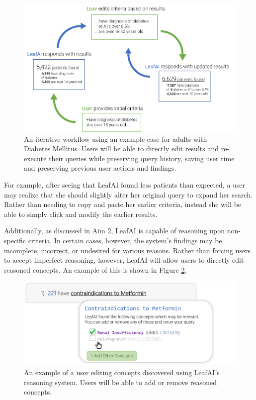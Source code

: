 \documentclass[../main.tex]{subfiles}
\begin{document}
\begin{figure}[h!]
  \centering
  \includegraphics[scale=1]{Figures/Aim3/aim3_feedback_loop.pdf}  
  \caption{An iterative workflow using an example case for adults with Diabetes Mellitus. Users will be able to directly edit results and re-execute their queries while preserving query history, saving user time and preserving previous user actions and findings.}
\label{aim3_fig_feedback_loop}
\end{figure}

For example, after seeing that LeafAI found less patients than expected, a user may realize that she should slightly alter her original query to expand her search. Rather than needing to copy and paste her earlier criteria, instead she will be able to simply click and modify the earlier results.

Additionally, as discussed in Aim 2, LeafAI is capable of reasoning upon non-specific criteria. In certain cases, however, the system's findings may be incomplete, incorrect, or undesired for various reasons. Rather than forcing users to accept imperfect reasoning, however, LeafAI will allow users to directly edit reasoned concepts. An example of this is shown in Figure \ref{aim3_fig_edit}.

\begin{figure}[h!]
  \centering
  \includegraphics[scale=0.68]{Figures/Aim3/aim3_edit.pdf}  
  \caption{An example of a user editing concepts discovered using LeafAI's reasoning system. Users will be able to add or remove reasoned concepts.}
\label{aim3_fig_edit}
\end{figure}
\end{document}
